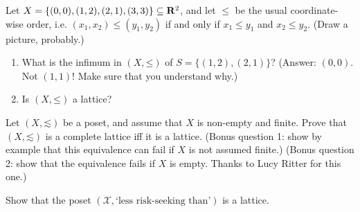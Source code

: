 \begin{exercise}
	\label{exercise:diamond}
	Let $X = \left\{ (0,0), (1,2), (2,1), (3,3) \right\} \subseteq \R^2$, and let $\leq$ be the usual coordinate-wise order, i.e. $(x_1,x_2) \leq (y_1,y_2)$ if and only if $x_1 \leq y_1$ and $x_2 \leq y_2$. (Draw a picture, probably.)
	
	\begin{enumerate}[label=(\alph*)]
	
		\item What is the infimum in $(X,\mathord{\leq})$ of $S = \{ (1,2), (2,1) \}$? (Answer: $(0,0)$. Not $(1,1)$! Make sure that you understand why.)

		\item Is $(X,\mathord{\leq})$ a lattice?
	
	\end{enumerate}
\end{exercise}

\begin{exercise}
	\label{exercise:latt_compl_finite}
	Let $(X,\mathord{\lesssim})$ be a poset, and assume that $X$ is non-empty and finite. Prove that $(X,\mathord{\lesssim})$ is a complete lattice iff it is a lattice. (Bonus question 1: show by example that this equivalence can fail if $X$ is not assumed finite.) (Bonus question 2: show that the equivalence fails if $X$ is empty. Thanks to Lucy Ritter for this one.)
\end{exercise}

\begin{namedthm}
	\label{exercise:arrow-pratt_lattice}
	Show that the poset $\left(\mathcal{X},\text{`less risk-seeking than'}\right)$ is a lattice.
\end{namedthm}


